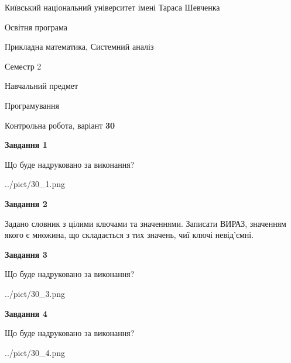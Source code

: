 \documentclass[12pt, ukrainian]{article}
\begin{document}
{{\begin {small}\par
{ \center  Київський національний університет імені Тараса Шевченка \par}
{\parbox {5 cm}{Освітня програма \hfill}{\parbox {8 cm}{Прикладна математика, Системний аналіз \hfill}}\parbox {5 cm}{\hfill Семестр 2}}\par
{\parbox {5 cm} {Навчальний предмет \hfill}\parbox {7 cm}{Програмування \hfill}\parbox {6cm}{\hfill}\par}\vspace{-7pt} \end{small}}{\center Контрольна робота, варіант  \No \textbf
{ 30 }\par}}
{
\begin {large}
{\begin {center}\textbf{Завдання 1}\end {center}}\par
Що буде надруковано за виконання?\par\par
\begin{center}
	{../pict/30_1.png}
\end{center}
\newpage

{\begin {center}\textbf{Завдання 2}\end {center}}\par
Задано словник  з цілими ключами та значеннями. Записати ВИРАЗ, значенням якого є множина, що складається  з тих значень, чиї ключі невід'єм\-ні.\par
\newpage

{\begin {center}\textbf{Завдання 3}\end {center}}\par
Що буде надруковано за виконання?
\begin{center}
	{../pict/30_3.png}
\end{center}
\newpage

{\begin {center}\textbf{Завдання 4}\end {center}}\par
Що буде надруковано за виконання?\par
\begin{center}
	{../pict/30_4.png}
\end{center}
\newpage


\end{large}}
\end{document}
